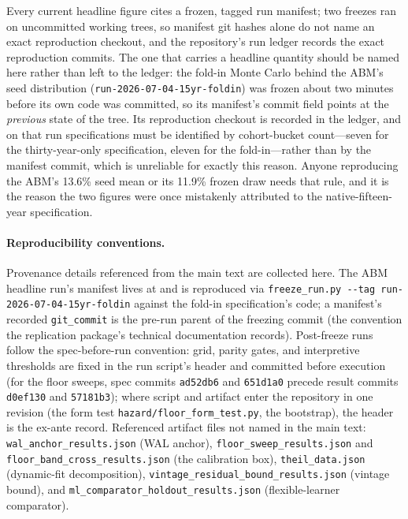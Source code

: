 \documentclass[12pt]{article}
\begin{document}
Every current headline figure cites a frozen, tagged run manifest; two freezes ran on uncommitted working trees, so manifest git hashes alone do not name an exact reproduction checkout, and the repository's run ledger records the exact reproduction commits. The one that carries a headline quantity should be named here rather than left to the ledger: the fold-in Monte Carlo behind the ABM's seed distribution (\texttt{run-2026-07-04-15yr-foldin}) was frozen about two minutes before its own code was committed, so its manifest's commit field points at the \emph{previous} state of the tree. Its reproduction checkout is recorded in the ledger, and on that run specifications must be identified by cohort-bucket count---seven for the thirty-year-only specification, eleven for the fold-in---rather than by the manifest commit, which is unreliable for exactly this reason. Anyone reproducing the ABM's 13.6\% seed mean or its 11.9\% frozen draw needs that rule, and it is the reason the two figures were once mistakenly attributed to the native-fifteen-year specification.

\paragraph{Reproducibility conventions.} Provenance details referenced from the main text are collected here. The ABM headline run's manifest lives at  and is reproduced via \texttt{freeze\_run.py -{}-tag run-2026-07-04-15yr-foldin} against the fold-in specification's code; a manifest's recorded \texttt{git\_commit} is the pre-run parent of the freezing commit (the convention the replication package's technical documentation records). Post-freeze runs follow the spec-before-run convention: grid, parity gates, and interpretive thresholds are fixed in the run script's header and committed before execution (for the floor sweeps, spec commits \texttt{ad52db6} and \texttt{651d1a0} precede result commits \texttt{d0ef130} and \texttt{57181b3}); where script and artifact enter the repository in one revision (the form test \texttt{hazard/floor\_form\_test.py}, the bootstrap), the header is the ex-ante record. Referenced artifact files not named in the main text: \texttt{wal\_anchor\_results.json} (WAL anchor), \texttt{floor\_sweep\_results.json} and \texttt{floor\_band\_cross\_results.json} (the calibration box), \texttt{theil\_data.json} (dynamic-fit decomposition), \texttt{vintage\_residual\_bound\_results.json} (vintage bound), and \texttt{ml\_comparator\_holdout\_results.json} (flexible-learner comparator).
\end{document}
